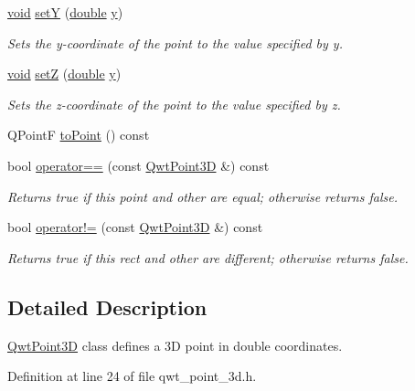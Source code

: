 \begin{DoxyCompactItemize}
\hyperlink{group___u_a_v_objects_plugin_ga444cf2ff3f0ecbe028adce838d373f5c}{void} \hyperlink{class_qwt_point3_d_a986ba13d44e6960b4fb72795be4ff66a}{set\-Y} (\hyperlink{_super_l_u_support_8h_a8956b2b9f49bf918deed98379d159ca7}{double} \hyperlink{glext_8h_a42315f3ed8fff752bb47fd782309fcfc}{y})
\begin{DoxyCompactList}\small\item\em Sets the y-\/coordinate of the point to the value specified by y. \end{DoxyCompactList}\item 
\hyperlink{group___u_a_v_objects_plugin_ga444cf2ff3f0ecbe028adce838d373f5c}{void} \hyperlink{class_qwt_point3_d_ae4bed4f5b955843dcf92302b16799e8b}{set\-Z} (\hyperlink{_super_l_u_support_8h_a8956b2b9f49bf918deed98379d159ca7}{double} \hyperlink{glext_8h_a42315f3ed8fff752bb47fd782309fcfc}{y})
\begin{DoxyCompactList}\small\item\em Sets the z-\/coordinate of the point to the value specified by z. \end{DoxyCompactList}\item 
Q\-Point\-F \hyperlink{class_qwt_point3_d_a611b2608fdbe8099ae987870a10b38a6}{to\-Point} () const 
\item 
bool \hyperlink{class_qwt_point3_d_aaafd119aea020d1e7e44360fd1172c22}{operator==} (const \hyperlink{class_qwt_point3_d}{Qwt\-Point3\-D} \&) const 
\begin{DoxyCompactList}\small\item\em Returns true if this point and other are equal; otherwise returns false. \end{DoxyCompactList}\item 
bool \hyperlink{class_qwt_point3_d_a38b3c81b7dfce567dfc2993db1aa6d74}{operator!=} (const \hyperlink{class_qwt_point3_d}{Qwt\-Point3\-D} \&) const 
\begin{DoxyCompactList}\small\item\em Returns true if this rect and other are different; otherwise returns false. \end{DoxyCompactList}\end{DoxyCompactItemize}


\subsection{Detailed Description}
\hyperlink{class_qwt_point3_d}{Qwt\-Point3\-D} class defines a 3\-D point in double coordinates. 

Definition at line 24 of file qwt\-\_\-point\-\_\-3d.\-h.



